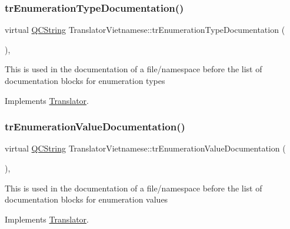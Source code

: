 \subsubsection{\texorpdfstring{trEnumerationTypeDocumentation()}{trEnumerationTypeDocumentation()}}
{\footnotesize\ttfamily virtual \mbox{\hyperlink{class_q_c_string}{Q\+C\+String}} Translator\+Vietnamese\+::tr\+Enumeration\+Type\+Documentation (\begin{DoxyParamCaption}{ }\end{DoxyParamCaption})\hspace{0.3cm}{\ttfamily [inline]}, {\ttfamily [virtual]}}

This is used in the documentation of a file/namespace before the list of documentation blocks for enumeration types 

Implements \mbox{\hyperlink{class_translator}{Translator}}.

\mbox{\label{class_translator_vietnamese_a7135d41ed09f9679170644718a05229b}} 
\subsubsection{\texorpdfstring{trEnumerationValueDocumentation()}{trEnumerationValueDocumentation()}}
{\footnotesize\ttfamily virtual \mbox{\hyperlink{class_q_c_string}{Q\+C\+String}} Translator\+Vietnamese\+::tr\+Enumeration\+Value\+Documentation (\begin{DoxyParamCaption}{ }\end{DoxyParamCaption})\hspace{0.3cm}{\ttfamily [inline]}, {\ttfamily [virtual]}}

This is used in the documentation of a file/namespace before the list of documentation blocks for enumeration values 

Implements \mbox{\hyperlink{class_translator}{Translator}}.

\mbox{\label{class_translator_vietnamese_ac5be5beab0e1a57f014a0c2f16ad5bb5}} 
